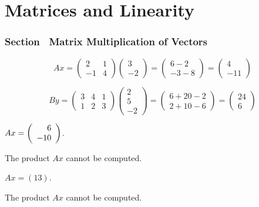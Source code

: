 \chapter{Matrices and Linearity}

\subsection*{Section~\protect{\ref{S:4.1}} Matrix Multiplication of Vectors}

\[
Ax =
\left(\begin{array}{rr} 2 & 1 \\ -1 & 4\end{array}\right)
\left(\begin{array}{r} 3 \\ -2\end{array}\right) =
\left(\begin{array}{r} 6 - 2 \\ -3 - 8\end{array}\right) =
\left(\begin{array}{r} 4 \\ -11\end{array}\right)
\]

\[
By =
\left(\begin{array}{rrr} 3 & 4 & 1 \\ 1 & 2 & 3\end{array}\right)
\left(\begin{array}{r} 2 \\ 5 \\ -2\end{array}\right) = 
\left(\begin{array}{r} 6 + 20 - 2 \\ 2 + 10 - 6\end{array}\right) =
\left(\begin{array}{r} 24 \\ 6\end{array}\right)
\]

 $Ax = \left(\begin{array}{r} 6 \\ -10\end{array}\right)$.

 The product $Ax$ cannot be computed.

 $Ax = \left(13\right)$.

 The product $Ax$ cannot be computed.

